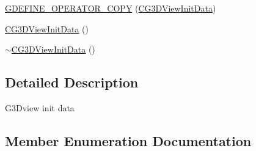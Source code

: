 \begin{DoxyCompactItemize}
\item 
\hyperlink{class_c_g3_d_view_init_data_ad9753063e6dc48a85e6b32947ede8c3b}{G\+D\+E\+F\+I\+N\+E\+\_\+\+O\+P\+E\+R\+A\+T\+O\+R\+\_\+\+C\+O\+P\+Y} (\hyperlink{class_c_g3_d_view_init_data}{C\+G3\+D\+View\+Init\+Data})
\item 
\hyperlink{class_c_g3_d_view_init_data_a016f159a05ad9586b410dc02a6e726d8}{C\+G3\+D\+View\+Init\+Data} ()
\item 
\hyperlink{class_c_g3_d_view_init_data_aaabb4a0a1a903b92baf7f343b1cc8db7}{$\sim$\+C\+G3\+D\+View\+Init\+Data} ()
\end{DoxyCompactItemize}


\subsection{Detailed Description}

\begin{DoxyItemize}
\item G3\+Dview init data 
\end{DoxyItemize}

\subsection{Member Enumeration Documentation}
\hypertarget{class_c_g3_d_view_init_data_a87424491f9faef1783b3b08114a2ebb0}{}
